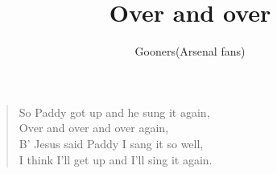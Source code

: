 \documentclass[a4paper,12pt]{article}
\title{Over and over}
\author{Gooners(Arsenal fans)}
\date{}
\begin{document}
	
	\maketitle
	
	\begin{verse}
		
		So Paddy got up and he sung it again, \\ 
		Over and over and over again, \\ 
		B' Jesus said Paddy I sang it so well, \\ 
		I think I'll get up and I'll sing it again.
		
	\end{verse}
	
\end{document}
